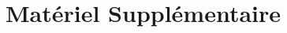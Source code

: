 \begin{comment}
\end{comment}

\appendix
\renewcommand\chapterstring{Annexe}
\chapter{Matériel Supplémentaire}


\kant[18-20]
